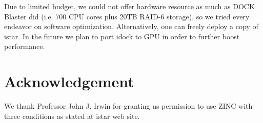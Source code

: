 \documentclass{bioinfo}
\begin{document}
Due to limited budget, we could not offer hardware resource as much as DOCK Blaster did (i.e. 700 CPU cores plus 20TB RAID-6 storage), so we tried every endeavor on software optimization. Alternatively, one can freely deploy a copy of istar. In the future we plan to port idock to GPU in order to further boost performance.

\section*{Acknowledgement}

We thank Professor John J. Irwin for granting us permission to use ZINC with three conditions as stated at istar web site.



\end{document}
